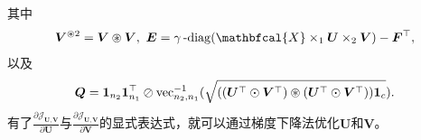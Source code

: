 其中
\begin{equation*}
\boldsymbol{V}^{\oast 2}=\boldsymbol{V}\oast\boldsymbol{V},
~\boldsymbol{E} = \mydiag(\mathbfcal{X}\times_{1}\boldsymbol{U}\times_{2}\boldsymbol{V}) - \boldsymbol{F}^{\top},
\end{equation*}
以及
\begin{equation*}
    \boldsymbol{Q}=\bm{1}_{n_{2}}\bm{1}_{n_{1}}^{\top}\oslash\operatorname{vec}_{n_{2},n_{1}}^{-1}(\sqrt{((\boldsymbol{U}^{\top}\odot\boldsymbol{V}^{\top})\oast(\boldsymbol{U}^{\top}\odot\boldsymbol{V}^{\top}))\boldsymbol{1}_{c}}).
\end{equation*}
有了$\frac{\partial\mathcal{J}_{\boldsymbol{U},\boldsymbol{V}}}{\partial\boldsymbol{U}}$与$\frac{\partial\mathcal{J}_{\boldsymbol{U},\boldsymbol{V}}}{\partial\boldsymbol{V}}$的显式表达式，就可以通过梯度下降法优化$\boldsymbol{U}$和$\boldsymbol{V}$。

